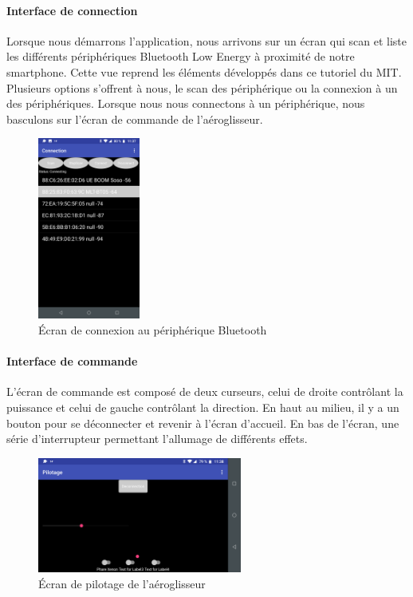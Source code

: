 \documentclass[a4paper,12pt]{book}
\begin{document}
		\paragraph{Interface de connection} Lorsque nous démarrons l'application, nous arrivons sur un écran qui scan et liste les différents périphériques Bluetooth Low Energy à proximité de notre smartphone. Cette vue reprend les éléments développés dans ce tutoriel \cite{tutoBLE} du MIT. Plusieurs options s'offrent à nous, le scan des périphérique ou la connexion à un des périphériques. Lorsque nous nous connectons à un périphérique, nous basculons sur l'écran de commande de l'aéroglisseur.
		\begin{figure}
			\begin{center}
				\includegraphics[width=0.3\textwidth]{../Illus/AppConnection.png}
			\end{center}
			\caption{Écran de connexion au périphérique Bluetooth}
		\end{figure}
			\paragraph{Interface de commande} L'écran de commande est composé de deux curseurs, celui de droite contrôlant la puissance et celui de gauche contrôlant la direction. En haut au milieu, il y a un bouton pour se déconnecter et revenir à l'écran d'accueil. En bas de l'écran, une série d'interrupteur permettant l'allumage de différents effets.
			\begin{figure}
		\begin{center}
			\includegraphics[width=0.6\textwidth]{../Illus/AppPilotage.png}
		\end{center}
			\caption{Écran de pilotage de l'aéroglisseur}
		\end{figure}
\end{document}

